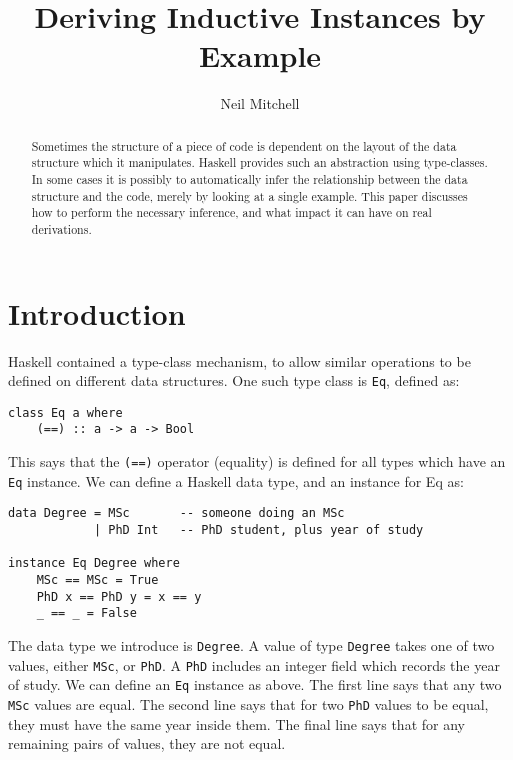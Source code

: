 \documentclass{llncs}
\newcommand{\T}[1]{\texttt{#1}}
\begin{document}
\title{Deriving Inductive Instances by Example}
\author{Neil Mitchell}


\maketitle

\begin{abstract}
Sometimes the structure of a piece of code is dependent on the layout of the data structure which it manipulates. Haskell provides such an abstraction using type-classes. In some cases it is possibly to automatically infer the relationship between the data structure and the code, merely by looking at a single example. This paper discusses how to perform the necessary inference, and what impact it can have on real derivations.
\end{abstract}

\section{Introduction}

Haskell contained a type-class mechanism, to allow similar operations to be defined on different data structures. One such type class is \T{Eq}, defined as:

\begin{verbatim}
class Eq a where
    (==) :: a -> a -> Bool
\end{verbatim}

This says that the \T{(==)} operator (equality) is defined for all types which have an \T{Eq} instance. We can define a Haskell data type, and an instance for Eq as:

\begin{verbatim}
data Degree = MSc       -- someone doing an MSc
            | PhD Int   -- PhD student, plus year of study

instance Eq Degree where
    MSc == MSc = True
    PhD x == PhD y = x == y
    _ == _ = False
\end{verbatim}

The data type we introduce is \T{Degree}. A value of type \T{Degree} takes one of two values, either \T{MSc}, or \T{PhD}. A \T{PhD} includes an integer field which records the year of study. We can define an \T{Eq} instance as above. The first line says that any two \T{MSc} values are equal. The second line says that for two \T{PhD} values to be equal, they must have the same year inside them. The final line says that for any remaining pairs of values, they are not equal.
\end{document}

